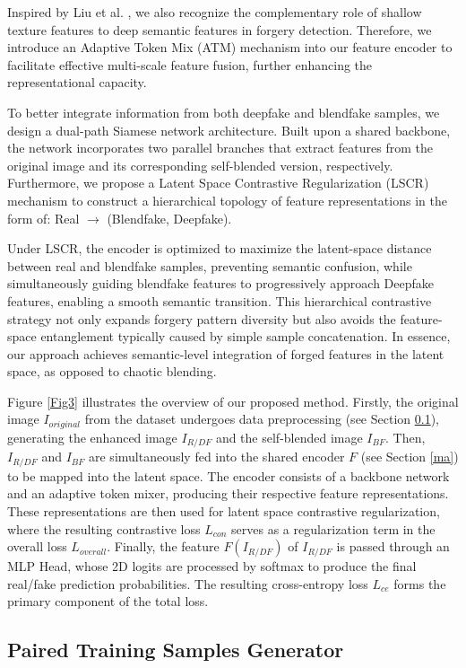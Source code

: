 \documentclass[final,5p,times]{elsarticle}
\begin{document}
Inspired by Liu et al. \cite{18}, we also recognize the complementary role of shallow texture features to deep semantic features in forgery detection. Therefore, we introduce an Adaptive Token Mix (ATM) mechanism into our feature encoder to facilitate effective multi-scale feature fusion, further enhancing the representational capacity.

To better integrate information from both deepfake and blendfake samples, we design a dual-path Siamese network architecture. Built upon a shared backbone, the network incorporates two parallel branches that extract features from the original image and its corresponding self-blended version, respectively. Furthermore, we propose a Latent Space Contrastive Regularization (LSCR) mechanism to construct a hierarchical topology of feature representations in the form of: Real $\rightarrow$ (Blendfake, Deepfake).

Under LSCR, the encoder is optimized to maximize the latent-space distance between real and blendfake samples, preventing semantic confusion, while simultaneously guiding blendfake features to progressively approach Deepfake features, enabling a smooth semantic transition. This hierarchical contrastive strategy not only expands forgery pattern diversity but also avoids the feature-space entanglement typically caused by simple sample concatenation. In essence, our approach achieves semantic-level integration of forged features in the latent space, as opposed to chaotic blending.

Figure \ref{Fig3} illustrates the overview of our proposed method. Firstly, the original image $I_{original}$ from the dataset undergoes data preprocessing (see Section \ref{ptsg}), generating the enhanced image $I_{R/DF}$ and the self-blended image $I_{BF}$. Then, $I_{R/DF}$ and $I_{BF}$ are simultaneously fed into the shared encoder $F$ (see Section \ref{ma}) to be mapped into the latent space. The encoder consists of a backbone network and an adaptive token mixer, producing their respective feature representations. These representations are then used for latent space contrastive regularization, where the resulting contrastive loss $L_{con}$ serves as a regularization term in the overall loss $L_{overall}$. Finally, the feature $F(I_{R/DF})$ of $I_{R/DF}$ is passed through an MLP Head, whose 2D logits are processed by softmax to produce the final real/fake prediction probabilities. The resulting cross-entropy loss $L_{ce}$ forms the primary component of the total loss.

\subsection{Paired Training Samples Generator} \label{ptsg}
\end{document}

